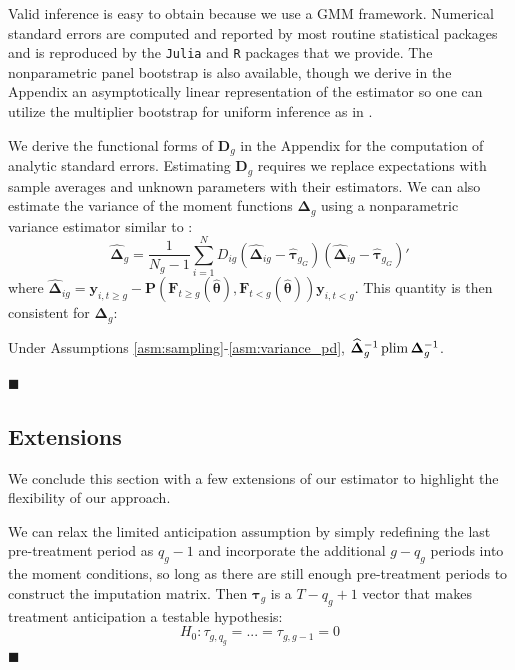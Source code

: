 \documentclass[12pt]{article}
\begin{document}
\begin{remark}[Inference]
    Valid inference is easy to obtain because we use a GMM framework. Numerical standard errors are computed and reported by most routine statistical packages and is reproduced by the \texttt{Julia} and \texttt{R} packages that we provide. The nonparametric panel bootstrap is also available, though we derive in the Appendix an asymptotically linear representation of the estimator so one can utilize the multiplier bootstrap for uniform inference as in \citet{Callaway_Karami_2020}. 

    We derive the functional forms of $\bm D_g$ in the Appendix for the computation of analytic standard errors. Estimating $\bm D_g$ requires we replace expectations with sample averages and unknown parameters with their estimators. We can also estimate the variance of the moment functions $\bm \Delta_g$ using a nonparametric variance estimator similar to \citet{pesaran2006estimation}:   \begin{equation}\label{eq:nonparametric_variance}
        \widehat{\bm \Delta}_g = \frac{1}{N_g - 1} \sum_{i = 1}^N D_{ig} \left( \widehat{\bm \Delta}_{ig} - \widehat{\bm \tau}_{g_G} \right) \left( \widehat{\bm \Delta}_{ig} - \widehat{\bm \tau}_{g_G} \right)'
    \end{equation}
    where $\widehat{\bm \Delta}_{ig} = \bm y_{i, t \geq g} - \bm P(\bm{F}_{t \geq g}(\widehat{\bm{\theta}}), \bm{F}_{t < g}(\widehat{\bm{\theta}})) \bm y_{i, t < g}$. This quantity is then consistent for $\bm \Delta_g$: 
    \begin{theorem}\label{theorem:nonparametric_variance}
  Under Assumptions \ref{asm:sampling}-\ref{asm:variance_pd}, $\widehat{\bm \Delta}_g^{-1} \operatorname{plim} \bm \Delta_g^{-1}$.
\end{theorem}
\noindent $\blacksquare$
\end{remark}

\subsection{Extensions}

We conclude this section with a few extensions of our estimator to highlight the flexibility of our approach.

\begin{remark}
We can relax the limited anticipation assumption by simply redefining the last pre-treatment period as $q_g - 1$ and incorporate the additional $g - q_g$ periods into the moment conditions, so long as there are still enough pre-treatment periods to construct the imputation matrix. Then $\bm \tau_g$ is a $T - q_g + 1$ vector that makes treatment anticipation a testable hypothesis:
\begin{equation}
H_0: \tau_{g,q_g} = ... = \tau_{g,g-1} = 0 
\end{equation}
$\blacksquare$
\end{remark} 
\end{document}
